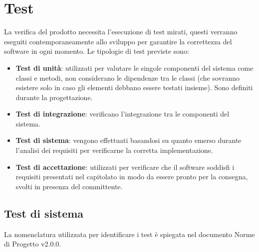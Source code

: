 \section{Test}
La verifica del prodotto necessita l'esecuzione di test mirati, questi verranno eseguiti contemporaneamente allo sviluppo per garantire la correttezza del software in ogni momento.
Le tipologie di test previste sono:
\begin{itemize}
    \item \textbf{Test di unità}: utilizzati per valutare le singole componenti del sistema come classi e metodi, non considerano le dipendenze tra le classi (che sovranno esistere solo in caso gli elementi debbano essere testati insieme).
    Sono definiti durante la progettazione.
    \item \textbf{Test di integrazione}: verificano l'integrazione tra le componenti del sistema.
    \item \textbf{Test di sistema}: vengono effettuati basandosi su quanto emerso durante l'analisi dei requisiti per verificarne la corretta implementazione.
    \item \textbf{Test di accettazione}: utilizzati per verificare che il software soddisfi i requisiti presentati nel capitolato in modo da essere pronto per la consegna, svolti in presenza del committente.    
\end{itemize}

\subsection{Test di sistema}
La nomenclatura utilizzata per identificare i test è spiegata nel documento Norme di Progetto v2.0.0.

